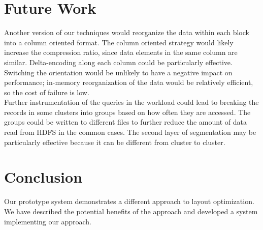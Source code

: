 \documentclass[paper=letter, fontsize=11pt]{scrartcl}
\numberwithin{equation}{section}		%
\numberwithin{figure}{section}			%
\numberwithin{table}{section}				%
\begin{document}
\section{Future Work}
Another version of our techniques would reorganize the data within each block into a column oriented format.  The column oriented strategy would likely increase the compression ratio, since data elements in the same column are similar.  Delta-encoding along each column could be particularly effective.  Switching the orientation would be unlikely to have a negative impact on performance; in-memory reorganization of the data would be relatively efficient, so the cost of failure is low. \\

Further instrumentation of the queries in the workload could lead to breaking the records in some clusters into groups based on how often they are accessed.  The groups could be written to different files to further reduce the amount of data read from HDFS in the common cases.  The second layer of segmentation may be particularly effective because it can be different from cluster to cluster. 

\section{Conclusion}
Our prototype system demonstrates a different approach to layout optimization.  We have described the potential benefits of the approach and developed a system implementing our approach.
\end{document}
